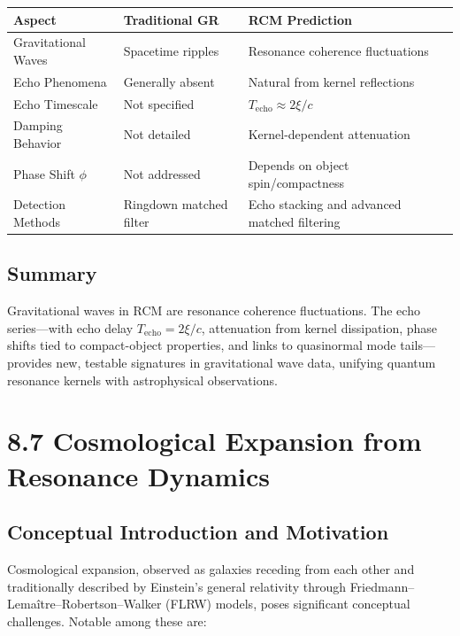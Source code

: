 \begin{center}
\begin{tabular}{|l|l|l|}
\hline
Aspect              & Traditional GR          & RCM Prediction                                 \\ \hline
Gravitational Waves & Spacetime ripples       & Resonance coherence fluctuations               \\ \hline
Echo Phenomena      & Generally absent        & Natural from kernel reflections                \\ \hline
Echo Timescale      & Not specified           & \(T_{\mathrm{echo}}\approx2\xi/c\)             \\ \hline
Damping Behavior    & Not detailed            & Kernel-dependent attenuation                   \\ \hline
Phase Shift \(\phi\)& Not addressed           & Depends on object spin/compactness             \\ \hline
Detection Methods   & Ringdown matched filter & Echo stacking and advanced matched filtering   \\ \hline
\end{tabular}
\end{center}

\subsection{Summary}

Gravitational waves in RCM are resonance coherence fluctuations. The echo series—with echo delay \(T_{\mathrm{echo}}=2\xi/c\), attenuation from kernel dissipation, phase shifts tied to compact-object properties, and links to quasinormal mode tails—provides new, testable signatures in gravitational wave data, unifying quantum resonance kernels with astrophysical observations.

\section{8.7 Cosmological Expansion from Resonance Dynamics}

\subsection{Conceptual Introduction and Motivation}

Cosmological expansion, observed as galaxies receding from each other and traditionally described by Einstein’s general relativity through Friedmann–Lemaître–Robertson–Walker (FLRW) models, poses significant conceptual challenges. Notable among these are:

